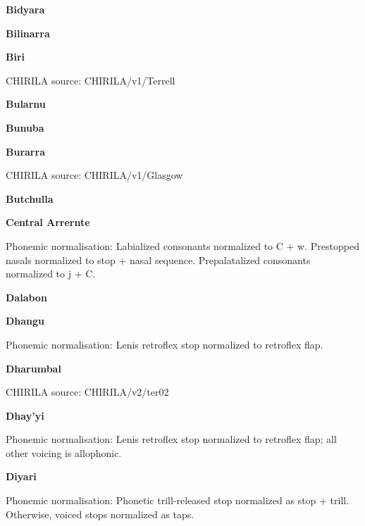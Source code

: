 \textbf{Bidyara}


\textbf{Bilinarra}


\textbf{Biri}

CHIRILA source: CHIRILA/v1/Terrell


\newpage


\textbf{Bularnu}


\textbf{Bunuba}


\textbf{Burarra}

CHIRILA source: CHIRILA/v1/Glasgow


\textbf{Butchulla}


\textbf{Central Arrernte}


Phonemic normalisation: Labialized consonants normalized to C + w.
Prestopped nasals normalized to stop + nasal sequence. Prepalatalized
consonants normalized to j + C.

\textbf{Dalabon}


\textbf{Dhangu}


Phonemic normalisation: Lenis retroflex stop normalized to retroflex
flap.

\newpage


\textbf{Dharumbal}

CHIRILA source: CHIRILA/v2/ter02


\textbf{Dhay'yi}


Phonemic normalisation: Lenis retroflex stop normalized to retroflex
flap; all other voicing is allophonic.

\textbf{Diyari}


Phonemic normalisation: Phonetic trill-released stop normalized as stop
+ trill. Otherwise, voiced stops normalized as taps.


